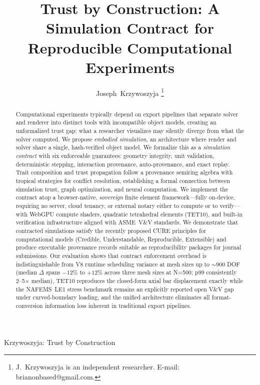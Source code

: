 \documentclass[journal]{IEEEtran}
\begin{document}
\title{Trust by Construction: A Simulation Contract for Reproducible Computational Experiments}

\author{Joseph~Krzywoszyja%
\thanks{J.\ Krzywoszyja is an independent researcher.
  E-mail: brianonbased@gmail.com.}}

%
{Krzywoszyja: Trust by Construction}

\maketitle

\begin{abstract}
Computational experiments typically depend on export pipelines that separate
solver and renderer into distinct tools with incompatible object models,
creating an unformalized trust gap: what a researcher visualizes may silently
diverge from what the solver computed. We propose \emph{embodied simulation},
an architecture where render and solver share a single, hash-verified object
model. We formalize this as a \emph{simulation contract} with six enforceable
guarantees: geometry integrity, unit validation, deterministic stepping,
interaction provenance, auto-provenance, and exact replay. Trait composition
and trust propagation follow a provenance semiring algebra with tropical
strategies for conflict resolution, establishing a formal connection between
simulation trust, graph optimization, and neural computation. We implement
the contract atop a browser-native, \emph{sovereign} finite element
framework---fully on-device, requiring no server, cloud tenancy, or
external notary either to compute or to verify---with WebGPU
compute shaders, quadratic tetrahedral elements (TET10), and built-in
verification infrastructure aligned with ASME~V\&V standards. We demonstrate that
contracted simulations satisfy the recently proposed CURE principles for
computational models (Credible, Understandable, Reproducible, Extensible)
and produce executable provenance records suitable as reproducibility
packages for journal submissions. Our evaluation shows that contract enforcement overhead is
indistinguishable from V8 runtime scheduling variance at mesh sizes
up to $\sim$900 DOF (median $\Delta$ spans $-12\%$ to $+12\%$ across
three mesh sizes at N{=}500; p99 consistently 2--5$\times$ median),
TET10 reproduces the closed-form axial bar displacement exactly while
the NAFEMS~LE1 stress benchmark remains an explicitly reported open
V\&V gap under curved-boundary loading, and the unified architecture
eliminates all format-conversion information loss inherent in
traditional export pipelines.
\end{abstract}
\end{document}
